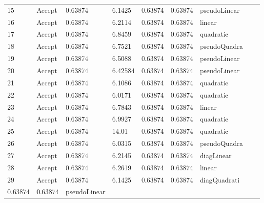 \documentclass[5p]{elsarticle}
\begin{document}
\begin{frontmatter}
\begin{table}[h!]
\begin{center}
\begin{tabular}{l | l | l|l|l|l|l|l|l}
15 & Accept &     0.63874  &      6.1425&        0.63874&    0.63874& pseudoLinear \\
16 & Accept &    0.63874  &      6.2114 &        0.63874&       0.63874&       linear \\
17 & Accept &     0.63874   &      6.8459&    0.63874&    0.63874&    quadratic \\
18 & Accept  &      0.63874  &      6.7521 & 
0.63874&      0.63874& pseudoQuadra \\
19 & Accept  & 0.63874 &     6.5088 &       0.63874&    0.63874   & pseudoLinear \\
20 & Accept &  0.63874  &    6.42584 &    0.63874 &     0.63874& pseudoLinear \\
21 & Accept &    0.63874 &      6.1086 &    0.63874 &     0.63874&    quadratic \\
22 & Accept &   0.63874   &      6.0171 &     0.63874   &      0.63874&    quadratic \\
23 & Accept &      0.63874   &      6.7843 & 0.63874  &    0.63874&       linear \\
24 & Accept &      0.63874  &      6.9927 & 0.63874  &     0.63874&    quadratic \\
25 & Accept &       0.63874  &      14.01 &   0.63874   &  0.63874&    quadratic \\
26 & Accept &    0.63874  &      6.0315 & 0.63874 &   0.63874 & pseudoQuadra \\
27 & Accept &      0.63874  &      6.2145 & 0.63874  &     0.63874&   diagLinear \\
28 & Accept &        0.63874 &      6.2619 &  0.63874  &     0.63874 &       linear \\
29 & Accept &           0.63874  &      6.1425&       0.63874   &     0.63874& diagQuadrati \\0.63874   &        0.63874 & pseudoLinear\\
\hline
    \end{tabular}
  \end{center}
\end{table}



\end{frontmatter}
\end{document}
